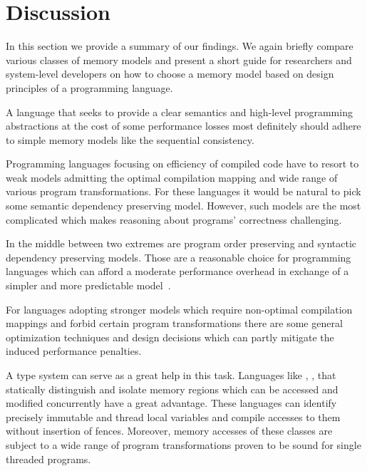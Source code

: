 \section{Discussion}
\label{sec:discussion}

In this section we provide a summary of our findings.
We again briefly compare various classes of memory models 
and present a short guide for researchers and system-level developers 
on how to choose a memory model based on 
design principles of a programming language.   

A language that seeks to provide a clear semantics and 
high-level programming abstractions at the cost 
of some performance losses most definitely should 
adhere to simple memory models like the sequential consistency. 

Programming languages focusing on efficiency 
of compiled code have to resort to weak models admitting 
the optimal compilation mapping 
and wide range of various program transformations. 
For these languages it would be natural 
to pick some semantic dependency preserving model. 
However, such models are the most complicated
which makes reasoning about programs' correctness challenging. 

In the middle between two extremes are program order preserving and 
syntactic dependency preserving models.
Those are a reasonable choice for programming languages
which can afford a moderate performance overhead 
in exchange of a simpler and more predictable model~\cite{Ou-Demsky:OOPSLA18}.

For languages adopting stronger models which require non-optimal
compilation mappings and forbid certain program transformations
there are some general optimization techniques and design decisions
which can partly mitigate the induced performance penalties.

A type system can serve as a great help in this task. 
Languages like \Haskell, \OCaml, \Rust that 
statically distinguish and isolate memory regions 
which can be accessed and modified concurrently have a great advantage.
These languages can identify precisely 
immutable and thread local variables
and compile accesses to them without insertion of fences.
Moreover, memory accesses of these classes are subject to 
a wide range of program transformations proven to be
sound for single threaded programs. 
 
